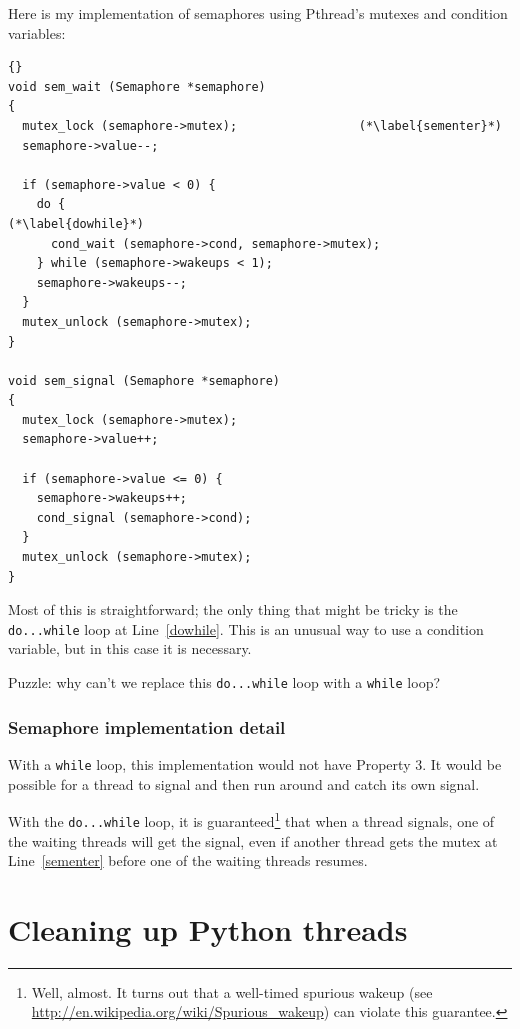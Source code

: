 \documentclass{book}
\newcommand{\clearemptydoublepage}{\newpage\cleardoublepage}
\begin{document}
Here is my implementation of semaphores using Pthread's mutexes
and condition variables:

\begin{lstlisting}[title={}]{}
void sem_wait (Semaphore *semaphore)
{
  mutex_lock (semaphore->mutex);                 (*\label{sementer}*)
  semaphore->value--;

  if (semaphore->value < 0) {
    do {                                                (*\label{dowhile}*)
      cond_wait (semaphore->cond, semaphore->mutex);
    } while (semaphore->wakeups < 1);
    semaphore->wakeups--;
  }
  mutex_unlock (semaphore->mutex);
}

void sem_signal (Semaphore *semaphore)
{
  mutex_lock (semaphore->mutex);
  semaphore->value++;

  if (semaphore->value <= 0) {
    semaphore->wakeups++;
    cond_signal (semaphore->cond);
  }
  mutex_unlock (semaphore->mutex);
}
\end{lstlisting}

Most of this is straightforward; the only thing that might be 
tricky is the {\tt do...while} loop at Line~\ref{dowhile}.
This is an unusual way to use a condition variable, but in
this case it is necessary.

Puzzle: why can't we replace this {\tt do...while} loop
with a {\tt while} loop?

\clearemptydoublepage
\subsection{Semaphore implementation detail}

With a {\tt while} loop, this implementation would not have
Property 3.  It would be possible for a thread to signal
and then run around and catch its own signal.

With the {\tt do...while} loop, it is guaranteed\footnote{Well,
  almost.  It turns out that a well-timed spurious wakeup (see
  \url{http://en.wikipedia.org/wiki/Spurious_wakeup}) can violate this
  guarantee.} that when a thread signals, one of the waiting threads
will get the signal, even if another thread gets the mutex at
Line~\ref{sementer} before one of the waiting threads resumes.





\appendix

\chapter{Cleaning up Python threads}
\label{cleanup}
\end{document}
